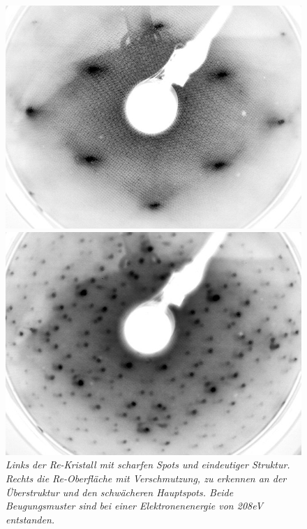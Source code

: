 \begin{figure}[htbp]
	\begin{minipage}[b]{0.5\textwidth} 
		\includegraphics[width=\textwidth]{LEED-Bilder/bearbeitet/unbedampft_E207}
	\end{minipage}
	\hfill
	\begin{minipage}[b]{0.5\textwidth}
		\includegraphics[width=\textwidth]{LEED-Bilder/bearbeitet/unbedampft_E207_MitteKristall.jpg}
	\end{minipage}
	\caption{\textit{Links der Re-Kristall mit scharfen Spots und eindeutiger Struktur. Rechts die
	Re-Oberfläche mit Verschmutzung, zu erkennen an der Überstruktur und den schwächeren Hauptspots.
	Beide Beugungsmuster sind bei einer Elektronenenergie von 208eV entstanden.}}
	\label{rekristall} 
\end{figure}

